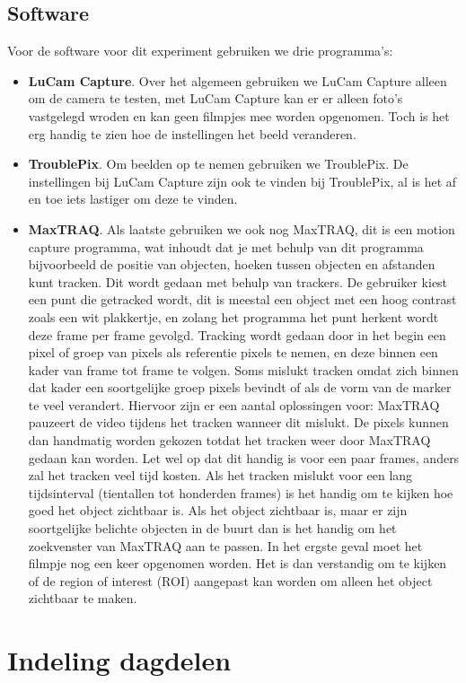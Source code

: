 \documentclass{article}
\begin{document}
\subsection{Software}
Voor de software voor dit experiment gebruiken we drie programma's:
\begin{itemize}
\item \textbf{LuCam Capture}. Over het algemeen gebruiken we LuCam Capture alleen om de camera te testen, met LuCam Capture kan er er alleen foto's vastgelegd wroden en kan geen filmpjes mee worden opgenomen. Toch is het erg handig te zien hoe de instellingen het beeld veranderen. 
\item \textbf{TroublePix}. Om beelden op te nemen gebruiken we TroublePix. De instellingen bij LuCam Capture zijn ook te vinden bij TroublePix, al is het af en toe iets lastiger om deze te vinden.
\item \textbf{MaxTRAQ}. Als laatste gebruiken we ook nog MaxTRAQ, dit is een motion capture programma, wat inhoudt dat je met behulp van dit programma bijvoorbeeld de positie van objecten, hoeken tussen objecten en afstanden kunt tracken. Dit wordt gedaan met behulp van trackers. De gebruiker kiest een punt die getracked wordt, dit is meestal een object met een hoog contrast zoals een wit plakkertje, en zolang het programma het punt herkent wordt deze frame per frame gevolgd. Tracking wordt gedaan door in het begin een pixel of groep van pixels als referentie pixels te nemen, en deze binnen een kader van frame tot frame te volgen. Soms mislukt tracken omdat zich binnen dat kader een soortgelijke groep pixels bevindt of als de vorm van de marker te veel verandert. Hiervoor zijn er een aantal oplossingen voor: MaxTRAQ pauzeert de video tijdens het tracken wanneer dit mislukt. De pixels kunnen dan handmatig worden gekozen totdat het tracken weer door MaxTRAQ gedaan kan worden. Let wel op dat dit handig is voor een paar frames, anders zal het tracken veel tijd kosten. Als het tracken mislukt voor een lang tijdsinterval (tientallen tot honderden frames) is het handig om te kijken hoe goed het object zichtbaar is. Als het object zichtbaar is, maar er zijn soortgelijke belichte objecten in de buurt dan is het handig om het zoekvenster van MaxTRAQ aan te passen. In het ergste geval moet het filmpje nog een keer opgenomen worden. Het is dan verstandig om te kijken of de region of interest (ROI) aangepast kan worden om alleen het object zichtbaar te maken.
\end{itemize}
\section{Indeling dagdelen}
\end{document}
